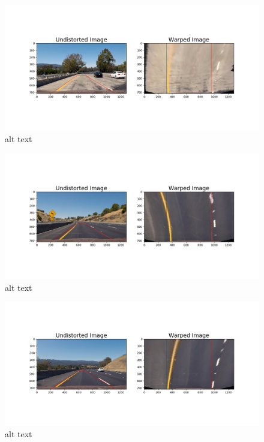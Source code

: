 \documentclass[11pt]{article}
\makeatletter
\def\maxwidth{\ifdim\Gin@nat@width>\linewidth\linewidth
    \else\Gin@nat@width\fi}
\let\Oldincludegraphics\includegraphics
\renewcommand{\includegraphics}[1]{\Oldincludegraphics[width=.8\maxwidth]{#1}}
\makeatother
\begin{document}
\begin{figure}
\centering
\includegraphics{./output_images/3_transformed/test1.png}
\caption{alt text}
\end{figure}

\begin{figure}
\centering
\includegraphics{./output_images/3_transformed/test2.png}
\caption{alt text}
\end{figure}

\begin{figure}
\centering
\includegraphics{./output_images/3_transformed/test3.png}
\caption{alt text}
\end{figure}
\end{document}
